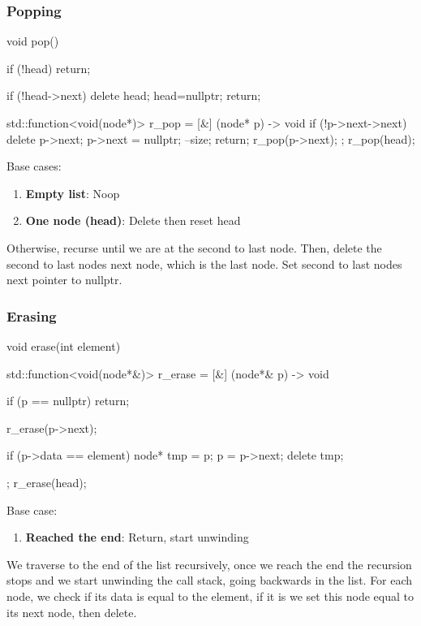 \documentclass{report}
\begin{document}
\pagebreak 
\subsubsection{Popping}
\bigbreak \noindent 
\begin{cppcode}
    void pop() {
        if (!head) return;

        if (!head->next) {
            delete head;
            head=nullptr;
            return;
        }

        std::function<void(node*)> r_pop = [&] (node* p) -> void {
            if (!p->next->next) {
                delete p->next;
                p->next = nullptr;
                --size;
                return;
            }
            r_pop(p->next);
        };
        r_pop(head);
    }
\end{cppcode}
\bigbreak \noindent 
Base cases:
\begin{enumerate}
    \item \textbf{Empty list}: Noop
    \item \textbf{One node (head)}: Delete then reset head
\end{enumerate}
Otherwise, recurse until we are at the second to last node. Then, delete the second to last nodes next node, which is the last node. Set second to last nodes next pointer to nullptr.

\pagebreak 
\subsubsection{Erasing}
\bigbreak \noindent 
\begin{cppcode}
    void erase(int element) {
        std::function<void(node*&)> r_erase = [&] (node*& p) -> void {
            if (p == nullptr) {
                return;
            }

            r_erase(p->next);

            if (p->data == element) {
                node* tmp = p;
                p = p->next;
                delete tmp;
            }
        };
        r_erase(head);
    }
\end{cppcode}
\bigbreak \noindent 
Base case:
\begin{enumerate}
    \item \textbf{Reached the end}: Return, start unwinding
\end{enumerate}
\bigbreak \noindent 
We traverse to the end of the list recursively, once we reach the end the recursion stops and we start unwinding the call stack, going backwards in the list.
\bigbreak \noindent 
For each node, we check if its data is equal to the element, if it is we set this node equal to its next node, then delete.
\end{document}
